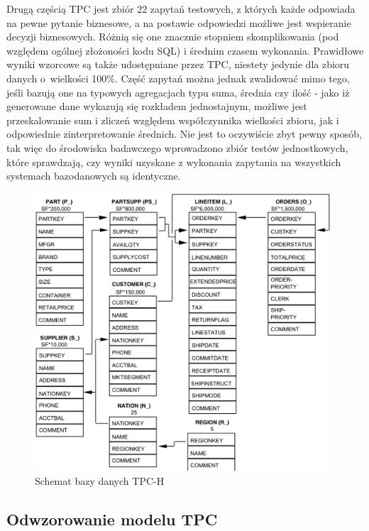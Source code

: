 \documentclass[12pt,twoside,openright]{extarticle}
\begin{document}
    Drugą częścią TPC jest zbiór 22 zapytań testowych, z których każde odpowiada na pewne pytanie biznesowe, a na postawie odpowiedzi możliwe jest wspieranie decyzji biznesowych. Różnią się one znacznie stopniem skomplikowania (pod względem ogólnej złożoności kodu SQL) i średnim czasem wykonania. Prawidłowe wyniki wzorcowe są także udostępniane przez TPC, niestety jedynie dla zbioru danych o~wielkości 100\%. Część zapytań można jednak zwalidować mimo tego, jeśli bazują one na typowych agregacjach typu suma, średnia czy ilość - jako iż generowane dane wykazują się rozkładem jednostajnym, możliwe jest przeskalowanie sum i zliczeń względem współczynnika wielkości zbioru, jak i odpowiednie zinterpretowanie średnich. Nie jest to oczywiście zbyt pewny sposób, tak więc do środowiska badawczego wprowadzono zbiór testów jednostkowych, które sprawdzają, czy wyniki uzyskane z wykonania zapytania na wszystkich systemach bazodanowych są identyczne.

\begin{figure}
\centering
\includegraphics[width=11cm]{tpc-schema.png}
\caption{Schemat bazy danych TPC-H}
\label{fig:tpcschema}
\end{figure}


\subsection{Odwzorowanie modelu TPC}
\end{document}
